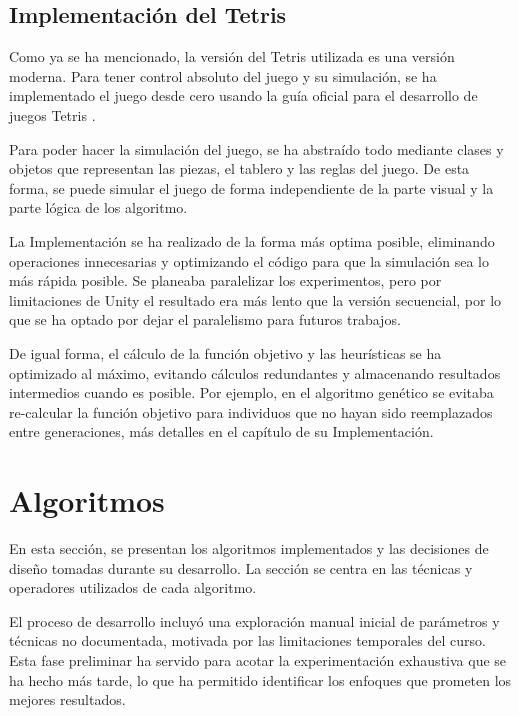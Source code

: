 \documentclass[11pt,spanish,listoffigures,listoftables]{tfgetsinf}
\begin{document}
\section{Implementación del Tetris}
Como ya se ha mencionado, la versión del Tetris utilizada es una versión moderna. Para tener control absoluto del juego y su simulación, se ha implementado el juego desde cero usando la guía oficial para el desarrollo de juegos Tetris \cite{}.

Para poder hacer la simulación del juego, se ha abstraído todo mediante clases y objetos que representan las piezas, el tablero y las reglas del juego. De esta forma, se puede simular el juego de forma independiente de la parte visual y la parte lógica de los algoritmo. 

La Implementación se ha realizado de la forma más optima posible, eliminando operaciones innecesarias y optimizando el código para que la simulación sea lo más rápida posible. Se planeaba paralelizar los experimentos, pero por limitaciones de Unity el resultado era más lento que la versión secuencial, por lo que se ha optado por dejar el paralelismo para futuros trabajos.

De igual forma, el cálculo de la función objetivo y las heurísticas se ha optimizado al máximo, evitando cálculos redundantes y almacenando resultados intermedios cuando es posible. Por ejemplo, en el algoritmo genético se evitaba re-calcular la función objetivo para individuos que no hayan sido reemplazados entre generaciones, más detalles en el capítulo de su Implementación.

\chapter{Algoritmos}
En esta sección, se presentan los algoritmos implementados y las decisiones de diseño tomadas durante su desarrollo. La sección se centra en las técnicas y operadores utilizados de cada algoritmo.

El proceso de desarrollo incluyó una exploración manual inicial de parámetros y técnicas no documentada, motivada por las limitaciones temporales del curso. Esta fase preliminar ha servido para acotar la experimentación exhaustiva que se ha hecho más tarde, lo que ha permitido identificar los enfoques que prometen los mejores resultados.
\end{document}
